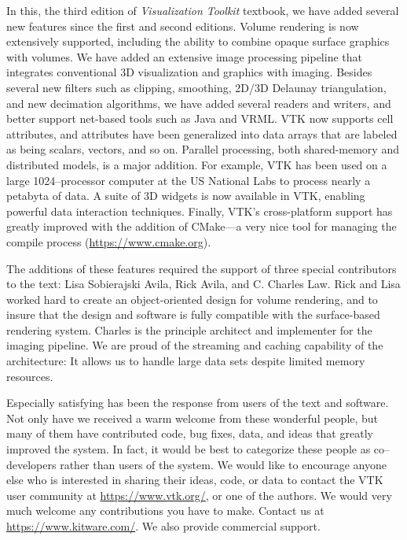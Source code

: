 In this, the third edition of \textit{Visualization Toolkit} textbook, we have added several new features since the first and second editions. Volume rendering is now extensively supported, including the ability to combine opaque surface graphics with volumes. We have added an extensive image processing pipeline that integrates conventional 3D visualization and graphics with imaging. Besides several new filters such as clipping, smoothing, 2D/3D Delaunay triangulation, and new decimation algorithms, we have added several readers and writers, and better support net-based tools such as Java and VRML. VTK now supports cell attributes, and attributes have been generalized into data arrays that are labeled as being scalars, vectors, and so on. Parallel processing, both shared-memory and distributed models, is a major addition. For example, VTK has been used on a large 1024--processor computer at the US National Labs to process nearly a petabyta of data. A suite of 3D widgets is now available in VTK, enabling powerful data interaction techniques. Finally, VTK's cross-platform support has greatly improved with the addition of CMake---a very nice tool for managing the compile process (\href{https://www.cmake.org}{https://www.cmake.org}).

The additions of these features required the support of three special contributors to the text: Lisa Sobierajski Avila, Rick Avila, and C. Charles Law. Rick and Lisa worked hard to create an object-oriented design for volume rendering, and to insure that the design and software is fully compatible with the surface-based rendering system. Charles is the principle architect and implementer for the imaging pipeline. We are proud of the streaming and caching capability of the architecture: It allows us to handle large data sets despite limited memory resources.

Especially satisfying has been the response from users of the text and software. Not only have we received a warm welcome from these wonderful people, but many of them have contributed code, bug fixes, data, and ideas that greatly improved the system. In fact, it would be best to categorize these people as co--developers rather than users of the system. We would like to encourage anyone else who is interested in sharing their ideas, code, or data to contact the VTK user community at \href{https://www.vtk.org/}{https://www.vtk.org/}, or one of the authors. We would very much welcome any contributions you have to make. Contact us at \href{https://www.kitware.com/}{https://www.kitware.com/}. We also provide commercial support.

